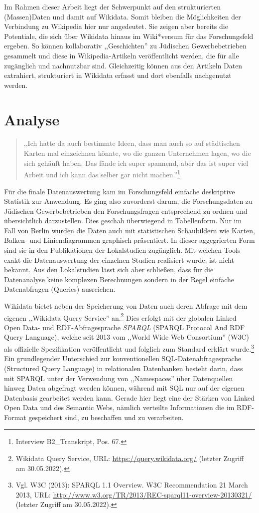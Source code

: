 Im Rahmen dieser Arbeit liegt der Schwerpunkt auf den strukturierten (Massen)Daten und damit auf Wikidata. Somit bleiben die Möglichkeiten der Verbindung zu Wikipedia hier nur angedeutet. Sie zeigen aber bereits die Potentiale, die sich über Wikidata hinaus im Wiki*versum für das Forschungsfeld ergeben. So können kollaborativ ,,Geschichten'' zu Jüdischen Gewerbebetrieben gesammelt und diese in Wikipedia-Artikeln veröffentlicht werden, die für alle zugänglich und nachnutzbar sind. Gleichzeitig können aus den Artikeln Daten extrahiert, strukturiert in Wikidata erfasst und dort ebenfalls nachgenutzt werden.

\section{Analyse}

\begin{quote}
    ,,Ich hatte da auch bestimmte Ideen, dass man auch so auf städtischen Karten mal einzeichnen könnte, wo die ganzen Unternehmen lagen, wo die sich gehäuft haben. Das fände ich super spannend, aber das ist super viel Arbeit und ich kann das selber gar nicht machen.''\footnote{Interview B2\_Transkript, Pos. 67.}
\end{quote}

Für die finale Datenauswertung kam im Forschungsfeld einfache deskriptive Statistik zur Anwendung. Es ging also zuvorderst darum, die Forschungsdaten zu Jüdischen Gewerbebetrieben den Forschungsfragen entsprechend zu ordnen und übersichtlich darzustellen. Dies geschah überwiegend in Tabellenform. Nur im Fall von Berlin wurden die Daten auch mit statistischen Schaubildern wie Karten, Balken- und Liniendiagrammen graphisch präsentiert. In dieser aggegrierten Form sind sie in den Publikationen der Lokalstudien zugänglich. Mit welchen Tools exakt die Datenauswertung der einzelnen Studien realisiert wurde, ist nicht bekannt. Aus den Lokalstudien lässt sich aber schließen, dass für die Datenanalyse keine komplexen Berechnungen sondern in der Regel einfache Datenabfragen (Queries) ausreichen. 

Wikidata bietet neben der Speicherung von Daten auch deren Abfrage mit dem eigenen ,,Wikidata Query Service'' an.\footnote{Wikidata Query Service, URL: \url{https://query.wikidata.org/} (letzter Zugriff am 30.05.2022).} Dies erfolgt mit der globalen Linked Open Data- und RDF-Abfragesprache \textit{SPARQL} (SPARQL Protocol And RDF Query Language), welche seit 2013 vom ,,World Wide Web Consortium'' (W3C) als offizielle Spezifikation veröffentlicht und folglich zum Standard erklärt wurde.\footnote{Vgl. W3C (2013): SPARQL 1.1 Overview. W3C Recommendation 21 March 2013, URL: \url{http://www.w3.org/TR/2013/REC-sparql11-overview-20130321/} (letzter Zugriff am 30.05.2022).} Ein grundlegender Unterschied zur konventionellen SQL-Datenabfragesprache (Structured Query Language) in relationalen Datenbanken besteht darin, dass mit SPARQL unter der Verwendung von ,,Namespaces'' über Datenquellen hinweg Daten abgefragt werden können, während mit SQL nur auf der eigenen Datenbasis gearbeitet werden kann. Gerade hier liegt eine der Stärken von Linked Open Data und des Semantic Webs, nämlich verteilte Informationen die im RDF-Format gespeichert sind, zu beschaffen und zu verarbeiten. 

